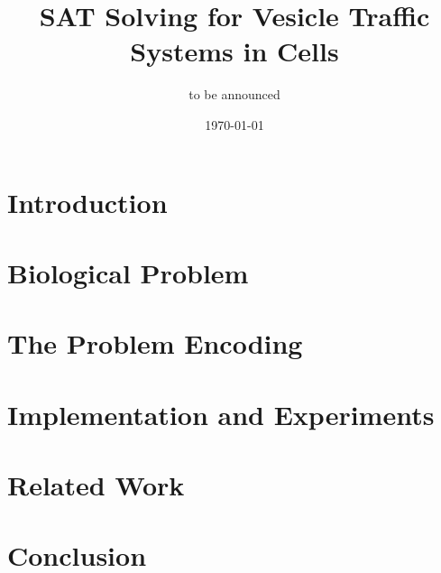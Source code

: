 \documentclass{llncs}
\begin{document}
\title{SAT Solving for Vesicle Traffic Systems in Cells}

\author{to be announced}

\date{\today}

\maketitle


\begin{abstract}

\end{abstract}

\section{Introduction}
\label{sec:intro}


\section{Biological Problem}
\label{sec:bio}


\section{The Problem Encoding}
\label{sec:encoding}


\section{Implementation and Experiments}
\label{sec:experiments}


\section{Related Work}
\label{sec:related}


\section{Conclusion}
\label{sec:conclusion}





\end{document}
